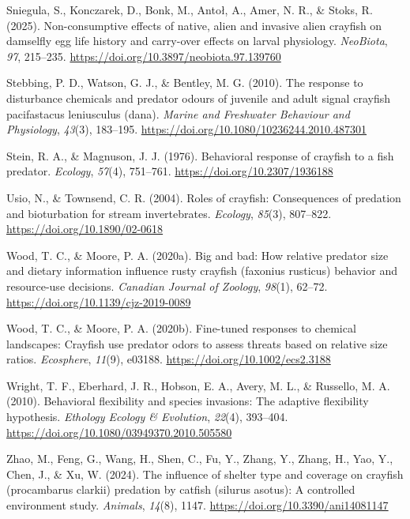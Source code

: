 \documentclass[
  letterpaper,
  DIV=11,
  numbers=noendperiod]{scrartcl}
\newlength{\cslhangindent}
\newenvironment{CSLReferences}[2] %
 {\begin{list}{}{%
  \setlength{\itemindent}{0pt}
  \setlength{\leftmargin}{0pt}
  \setlength{\parsep}{0pt}
  \ifodd #1
   \setlength{\leftmargin}{\cslhangindent}
   \setlength{\itemindent}{-1\cslhangindent}
  \fi
  \setlength{\itemsep}{#2\baselineskip}}}
 {\end{list}}
\begin{document}
\begin{CSLReferences}{1}{0}
Sniegula, S., Konczarek, D., Bonk, M., Antoł, A., Amer, N. R., \& Stoks,
R. (2025). Non-consumptive effects of native, alien and invasive alien
crayfish on damselfly egg life history and carry-over effects on larval
physiology. \emph{NeoBiota}, \emph{97}, 215--235.
\url{https://doi.org/10.3897/neobiota.97.139760}

Stebbing, P. D., Watson, G. J., \& Bentley, M. G. (2010). The response
to disturbance chemicals and predator odours of juvenile and adult
signal crayfish pacifastacus leniusculus (dana). \emph{Marine and
Freshwater Behaviour and Physiology}, \emph{43}(3), 183--195.
\url{https://doi.org/10.1080/10236244.2010.487301}

Stein, R. A., \& Magnuson, J. J. (1976). Behavioral response of crayfish
to a fish predator. \emph{Ecology}, \emph{57}(4), 751--761.
\url{https://doi.org/10.2307/1936188}

Usio, N., \& Townsend, C. R. (2004). Roles of crayfish: Consequences of
predation and bioturbation for stream invertebrates. \emph{Ecology},
\emph{85}(3), 807--822. \url{https://doi.org/10.1890/02-0618}

Wood, T. C., \& Moore, P. A. (2020a). Big and bad: How relative predator
size and dietary information influence rusty crayfish (faxonius
rusticus) behavior and resource-use decisions. \emph{Canadian Journal of
Zoology}, \emph{98}(1), 62--72.
\url{https://doi.org/10.1139/cjz-2019-0089}

Wood, T. C., \& Moore, P. A. (2020b). Fine-tuned responses to chemical
landscapes: Crayfish use predator odors to assess threats based on
relative size ratios. \emph{Ecosphere}, \emph{11}(9), e03188.
\url{https://doi.org/10.1002/ecs2.3188}

Wright, T. F., Eberhard, J. R., Hobson, E. A., Avery, M. L., \&
Russello, M. A. (2010). Behavioral flexibility and species invasions:
The adaptive flexibility hypothesis. \emph{Ethology Ecology \&
Evolution}, \emph{22}(4), 393--404.
\url{https://doi.org/10.1080/03949370.2010.505580}

Zhao, M., Feng, G., Wang, H., Shen, C., Fu, Y., Zhang, Y., Zhang, H.,
Yao, Y., Chen, J., \& Xu, W. (2024). The influence of shelter type and
coverage on crayfish (procambarus clarkii) predation by catfish (silurus
asotus): A controlled environment study. \emph{Animals}, \emph{14}(8),
1147. \url{https://doi.org/10.3390/ani14081147}

\end{CSLReferences}
\end{document}

